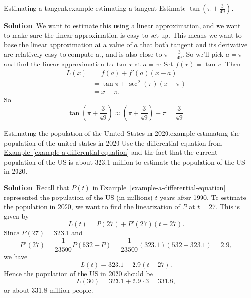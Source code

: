 \documentclass[10pt,]{book}
\numberwithin{equation}{section}
\begin{document}
\begin{example}{Estimating a tangent.}{example-estimating-a-tangent}%
\hypertarget{p-181}{}%
Estimate \(\tan(\pi+\frac{3}{49})\).%
\par\smallskip%
\noindent\textbf{Solution}.\hypertarget{solution-40}{}\quad%
\hypertarget{p-182}{}%
We want to estimate this using a linear approximation, and we want to make sure the linear approximation is easy to set up. This means we want to base the linear approximation at a value of \(a\) that both tangent and its derivative are relatively easy to compute at, and is also close to \(\pi+\frac{3}{49}\). So we'll pick \(a=\pi\) and find the linear approximation to \(\tan x\) at \(a = \pi\): Set \(f(x) = \tan x\). Then%
\begin{align*}
L(x) & = f(a) + f'(a)(x-a)\\
& = \tan\pi + \sec^{2}(\pi)(x-\pi) \\
& = x-\pi. 
\end{align*}
So%
\begin{equation*}
\tan(\pi+\frac{3}{49}) \approx (\pi+\frac{3}{49}) - \pi = \frac{3}{49}.
\end{equation*}
%
\end{example}
\begin{example}{Estimating the population of the United States in 2020.}{example-estimating-the-population-of-the-united-states-in-2020}%
\hypertarget{p-183}{}%
Use the differential equation from \hyperref[example-a-differential-equation]{Example~\ref{example-a-differential-equation}} and the fact that the current population of the US is about 323.1 million to estimate the population of the US in 2020.%
\par\smallskip%
\noindent\textbf{Solution}.\hypertarget{solution-41}{}\quad%
\hypertarget{p-184}{}%
Recall that \(P(t)\) in \hyperref[example-a-differential-equation]{Example~\ref{example-a-differential-equation}} represented the population of the US (in millions) \(t\) years after 1990. To estimate the population in 2020, we want to find the linearization of \(P\) at \(t = 27\). This is given by%
\begin{equation*}
L(t) = P(27) + P'(27)(t - 27).
\end{equation*}
Since \(P(27) = 323.1\) and%
\begin{equation*}
P'(27) = \frac{1}{23500}P(532-P) = \frac{1}{23500}(323.1)(532-323.1) = 2.9,
\end{equation*}
we have%
\begin{equation*}
L(t) = 323.1 + 2.9(t-27).
\end{equation*}
Hence the population of the US in 2020 should be%
\begin{equation*}
L(30) = 323.1 + 2.9\cdot3 = 331.8,
\end{equation*}
or about 331.8 million people.%
\end{example}
%
%
\typeout{************************************************}
\typeout{************************************************}
%
\end{document}
